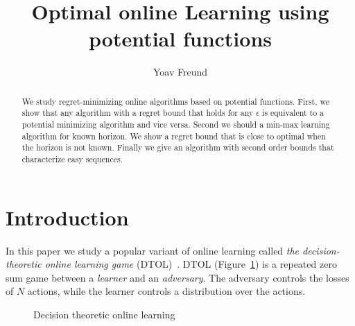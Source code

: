\documentclass{article}[12pt]
\title{Optimal online Learning using potential functions}
\author{Yoav Freund}
\begin{document}
\maketitle
\begin{abstract}
  We study regret-minimizing online algorithms based on potential
functions. First, we show that any algorithm with a regret bound that
holds for any $\epsilon$ is equivalent to a potential minimizing
algorithm and vice versa. Second we should a min-max learning
algorithm for known horizon. We show a regret bound that is close to
optimal when the horizon is not known. Finally we give an algorithm
with second order bounds that characterize easy sequences.
\end{abstract}

\section{Introduction}
In this paper we study a popular variant of online learning called
{\em the decision-theoretic online learning game}
(DTOL)~\cite{freund1997decision}. DTOL (Figure~\ref{fig:DTOL}) is a
repeated zero sum game between a {\em learner} and an {\em
  adversary}. The adversary controls the losses of $N$ actions, while
the learner controls a distribution over the actions.

\begin{figure}[ht!]
\caption{Decision theoretic online learning \label{fig:DTOL}}
\end{figure}
\end{document}
